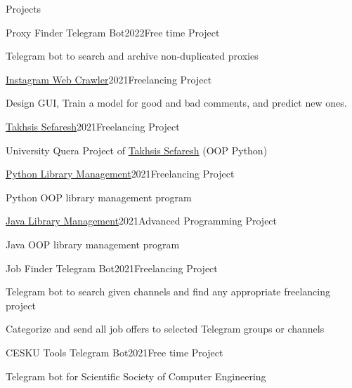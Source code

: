 \documentclass{resume} %
\begin{document}
\begin{rSection}{Projects}
\begin{rSubsection}{Proxy Finder Telegram Bot}{2022}{Free time Project}{ }
            \item Telegram bot to search and archive non-duplicated proxies
        \end{rSubsection}
        \begin{rSubsection}{\href{https://github.com/bestmahdi2/WebCrawlerProject}{Instagram Web Crawler}}{2021}{Freelancing Project}{ }
            \item Design GUI, Train a model for good and bad comments, and predict new ones.
        \end{rSubsection}
        \begin{rSubsection}{\href{https://github.com/bestmahdi2/TakhsisSefaresh}{Takhsis Sefaresh}}{2021}{Freelancing Project}{ }
            \item University Quera Project of \href{https://quera.org/problemset/106799}{Takhsis Sefaresh} (OOP Python)
        \end{rSubsection}
        \begin{rSubsection}{\href{https://github.com/bestmahdi2/LibraryPythonGUI}{Python Library Management}}{2021}{Freelancing Project}{ }
            \item Python OOP library management program
        \end{rSubsection}
        \begin{rSubsection}{\href{https://github.com/bestmahdi2/LibraryJavaGui}{Java Library Management}}{2021}{Advanced Programming Project}{ }
            \item Java OOP library management program
        \end{rSubsection}
        \begin{rSubsection}{Job Finder Telegram Bot}{2021}{Freelancing Project}{ }
            \item Telegram bot to search given channels and find any appropriate freelancing project
            \item Categorize and send all job offers to selected Telegram groups or channels
        \end{rSubsection}
        \begin{rSubsection}{CESKU Tools Telegram Bot}{2021}{Free time Project}{ }
            \item Telegram bot for Scientific Society of Computer Engineering
        \end{rSubsection}

\end{rSection}
\end{document}
